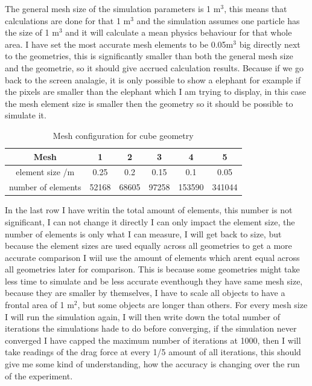 \documentclass[12pt,a4paper]{article}
\begin{document}
The general mesh size of the simulation parameters is 1 m$^3$, this means that calculations are done for that 1 m$^3$ and the simulation assumes one particle has the size of 1 m$^3$ and it will calculate a mean physics behaviour for that whole area. I have set the most accurate mesh elements to be 0.05m$^3$ big directly next to the geometries, this is significantly smaller than both the general mesh size and the geometrie, so it should give accrued calculation results. Because if we go back to the screen analagie, it is only possible to show a elephant for example if the pixels are smaller than the elephant which I am trying to display, in this case the mesh element size is smaller then the geometry so it should be possible to simulate it.

\begin{table}[H]
\centering
\caption{Mesh configuration for cube geometry}
\label{tab:mesh_config}
\begin{tabular}{|c|c|c|c|c|c|}
\hline
\rowcolor{red!50}
\textbf{Mesh} & \textbf{1} & \textbf{2} & \textbf{3} & \textbf{4} & \textbf{5} \\
\hline
element size /m & 0.25 & 0.2 & 0.15 & 0.1 & 0.05 \\
\hline
number of elements & 52168 & 68605 & 97258 & 153590 & 341044 \\
\hline
\end{tabular}
\end{table}

In the last row I have writin the total amount of elements, this number is not significant, I can not change it directly I can only impact the element size, the number of elements is only what I can measure, I will get back to size, but because the element sizes are used equally across all geometries to get a more accurate comparison I wiil use the amount of elements which arent equal across all geometries later for comparison. This is because some geometries might take less time to simulate and be less accurate eventhough they have same mesh size, because they are smaller by themselves, I have to scale all objects to have a frontal area of 1 m$^2$, but some objects are longer than others. For every mesh size I will run the simulation again, I will then write down the total number of iterations the simulations hade to do before converging, if the simulation never converged I have capped the maximum number of iterations at 1000, then I will take readings of the drag force at every 1/5 amount of all iterations, this should give me some kind of understanding, how the accuracy is changing over the run of the experiment.
\end{document}
